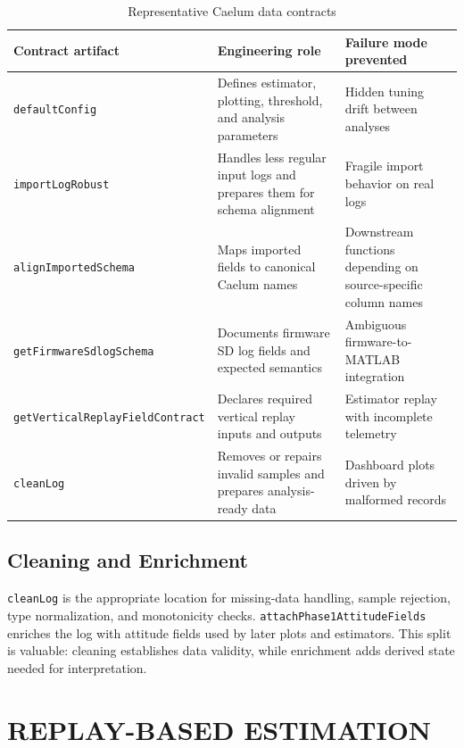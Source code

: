 \documentclass[colorlinks,upint,subscriptcorrection,varvw,hyphenate,balance]{asmeconf}
\newcommand{\code}[1]{\texttt{\allowbreak#1}}
\begin{document}
\begin{table}[t]
\caption{Representative Caelum data contracts}
\centering
\begin{tabularx}{\textwidth}{l Y Y}
\toprule
Contract artifact & Engineering role & Failure mode prevented \\
\midrule
\code{defaultConfig} & Defines estimator, plotting, threshold, and analysis parameters & Hidden tuning drift between analyses \\
\code{importLogRobust} & Handles less regular input logs and prepares them for schema alignment & Fragile import behavior on real logs \\
\code{alignImportedSchema} & Maps imported fields to canonical Caelum names & Downstream functions depending on source-specific column names \\
\code{getFirmwareSdlogSchema} & Documents firmware SD log fields and expected semantics & Ambiguous firmware-to-MATLAB integration \\
\code{getVerticalReplayFieldContract} & Declares required vertical replay inputs and outputs & Estimator replay with incomplete telemetry \\
\code{cleanLog} & Removes or repairs invalid samples and prepares analysis-ready data & Dashboard plots driven by malformed records \\
\bottomrule
\end{tabularx}
\label{tab:contracts}
\end{table}

\subsection{Cleaning and Enrichment}
\code{cleanLog} is the appropriate location for missing-data handling, sample rejection, type normalization, and monotonicity checks. \code{attachPhase1AttitudeFields} enriches the log with attitude fields used by later plots and estimators. This split is valuable: cleaning establishes data validity, while enrichment adds derived state needed for interpretation.

\section{REPLAY-BASED ESTIMATION}
\end{document}
